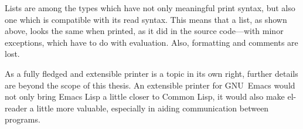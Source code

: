 \documentclass[a4paper,10pt,twoside]{article}
\newcommand{\el}{Emacs Lisp}
\newcommand{\cl}{Common Lisp}
\newcommand{\elr}{el-reader}
\newcommand{\emacs}{GNU~Emacs}
\begin{document}
Lists are among the types which have not only meaningful print syntax, but also
one which is compatible with its read syntax.  This means that a list, as shown
above, looks the same when printed, as it did in the source code---with minor
exceptions, which have to do with evaluation.  Also, formatting and comments are
lost.

As a fully fledged and extensible printer is a topic in its own right, further
details are beyond the scope of this thesis.  An extensible printer for \emacs{}
would not only bring \el{} a little closer to \cl{}, it would also make \elr{} a
little more valuable, especially in aiding communication between programs.




\begin{comment}
  The reason why lisp code has so many parentheses, is that parentheses denote a
  list in Lisp.  Expressions in general, save the most trivial ones, are
  represented of lists containing other lists and symbols.\footnote{Plus of
    course other entities such as numbers, yet these are not relevant to this
    discussion.}
\end{comment}

\end{document}
